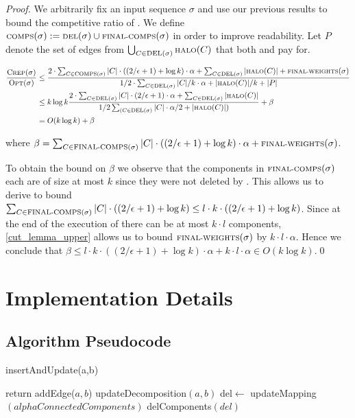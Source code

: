 \documentclass[a4paper,xcolor=dvipsnames, tikz, 12pt]{article}
\newcommand{\crep}{\text{C{\scriptsize REP}}}
\newcommand{\del}{\text{\scriptsize DEL}}
\newcommand{\opt}{\text{O{\scriptsize PT}}}
\newcommand{\halo}{\text{\scriptsize HALO}}
\newcommand{\finalComps}{\text{\scriptsize FINAL-COMPS}}
\newcommand{\finalWeights}{\text{\scriptsize FINAL-WEIGHTS}}
\newcommand{\comps}{\text{\scriptsize COMPS}}
\theoremstyle{definition}
\begin{document}
\textit{Proof.} We arbitrarily fix an input sequence $\sigma$ and use our previous results to bound the competitive ratio of \crep{}. We define $\comps(\sigma):=\del{}(\sigma)\cup\finalComps(\sigma)$ in order to improve readability. Let $P$ denote the set of edges from $\bigcup_{C\in\del{}(\sigma)}\halo{}(C)$ that both \crep{} and \opt{} pay for.

\begin{align*}
\frac{\crep{}(\sigma)}{\opt(\sigma)} &\leq\frac{2\cdot\sum_{C\in\comps(\sigma)}|C|\cdot((2/\epsilon+1)+\log k)\cdot\alpha+\sum_{C\in\del{}(\sigma)}|\halo(C)|+\finalWeights(\sigma)}{1/2\cdot\sum_{C\in\del{}(\sigma)}|C|/k\cdot\alpha+|\halo(C)|/k +|P|}\\
&\leq k \log k\frac{2\cdot\sum_{C\in\del(\sigma)}|C|\cdot(2/\epsilon+1) \cdot\alpha+\sum_{C\in\del{}(\sigma)}|\halo(C)|}{1/2\sum_{(C\in\del{}(\sigma)}|C|\cdot\alpha/2+|\halo(C)|)}+\beta\\
& = O(k \log k) +\beta
\end{align*}

\noindent where $\beta=\sum_{C\in \finalComps(\sigma)}|C|\cdot((2/\epsilon+1)+\log k)\cdot\alpha+\finalWeights(\sigma)$.

To obtain the bound on $\beta$ we observe that the components in $\finalComps(\sigma)$ each are of size at most $k$ since they were not deleted by \crep{}. This allows us to derive to bound $\sum_{C\in \finalComps(\sigma)}|C|\cdot((2/\epsilon+1)+\log k)\leq l \cdot k \cdot ((2/\epsilon+1)+\log k)$. Since at the end of the execution of \crep{} there can be at most $k\cdot l$ components, \cref{cut_lemma_upper} allows us to bound $\finalWeights(\sigma)$ by $k\cdot l \cdot\alpha$. Hence we conclude that $\beta\leq l\cdot k \cdot
((2/\epsilon+1)+\log k)\cdot\alpha+k\cdot l\cdot \alpha\in O(k \log k)$.\qed


\section{Implementation Details}
\label{implDetSection}


\subsection{Algorithm Pseudocode}

\begin{algorithm}
	\caption{insertAndUpdate(a,b)}
	\label{insertAndUpdate}
	\begin{algorithmic}
		\STATE return
		\ENDIF
		\STATE addEdge($a,b$)
		\STATE updateDecomposition$(a,b)$
		\STATE del$\leftarrow$ updateMapping$(alphaConnectedComponents)$
		\STATE delComponents$(del)$
	\end{algorithmic}
\end{algorithm}
\end{document}
